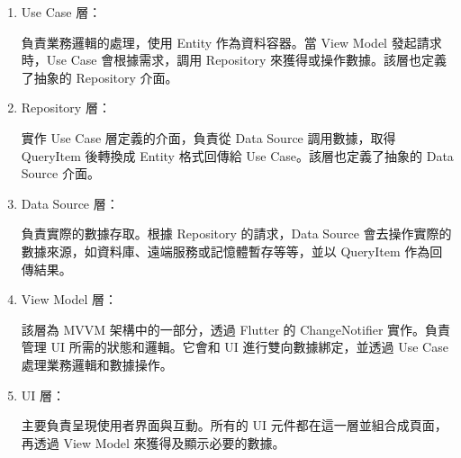\begin{enumerate}

    \item Use Case 層：

    負責業務邏輯的處理，使用 Entity 作為資料容器。當 View Model 發起請求時，Use Case 會根據需求，調用 Repository 來獲得或操作數據。該層也定義了抽象的 Repository 介面。

    \item Repository 層：

    實作 Use Case 層定義的介面，負責從 Data Source 調用數據，取得 QueryItem 後轉換成 Entity 格式回傳給 Use Case。該層也定義了抽象的 Data Source 介面。

    \item Data Source 層：

    負責實際的數據存取。根據 Repository 的請求，Data Source 會去操作實際的數據來源，如資料庫、遠端服務或記憶體暫存等等，並以 QueryItem 作為回傳結果。

    \item View Model 層：

    該層為 MVVM 架構中的一部分，透過 Flutter 的 ChangeNotifier 實作。負責管理 UI 所需的狀態和邏輯。它會和 UI 進行雙向數據綁定，並透過 Use Case 處理業務邏輯和數據操作。

    \item UI 層：

    主要負責呈現使用者界面與互動。所有的 UI 元件都在這一層並組合成頁面，再透過 View Model 來獲得及顯示必要的數據。

\end{enumerate}
